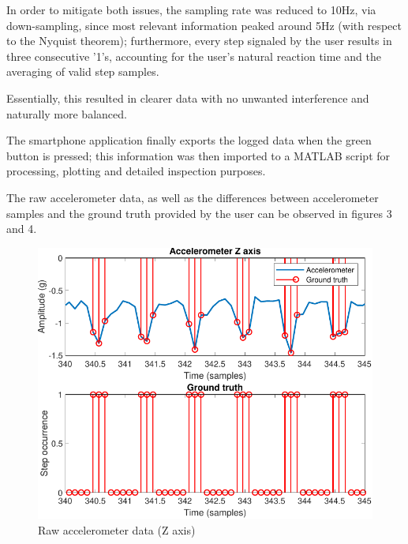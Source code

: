 \documentclass[conference]{IEEEtran}
\begin{document}
In order to mitigate both issues, the sampling rate was reduced to 10Hz, via down-sampling, since most relevant information peaked around 5Hz (with respect to the Nyquist theorem); furthermore, every step signaled by the user results in three consecutive '1's, accounting for the user's natural reaction time and the averaging of valid step samples.\par
Essentially, this resulted in clearer data with no unwanted interference and naturally more balanced.
\par The smartphone application finally exports the logged data when the green button is pressed; this information was then imported to a MATLAB script for processing, plotting and detailed inspection purposes.\par
The raw accelerometer data, as well as the differences between accelerometer samples and the ground truth provided by the user can be observed in figures 3 and 4.
\begin{figure}[H]
\centering
\includegraphics[scale=0.6]{Figure1.pdf}
\caption{Raw accelerometer data (Z axis)}
\label{fig:rawacc}
\end{figure}
\end{document}
